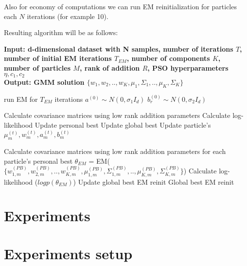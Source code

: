 \documentclass[a4paper]{article}
\begin{document}
Also for economy of computations we can run EM reinitialization for particles each $N$ iterations (for example 10).

Resulting algorithm will be as follows:

\begin{algorithm}
    \caption{}\label{alg:cap}
    \hspace*{\algorithmicindent} \textbf{Input: d-dimensional dataset with N samples, number of iterations $T$, number of initial EM iterations $T_{EM}$, 
    number of components $K$, number of particles $M$, rank of addition $R$,
    PSO hyperparameters $\eta, c_1, c_2$} \\
    \hspace*{\algorithmicindent} \textbf{Output: GMM solution $\{w_1, w_2, .., w_K, \mu_1, \Sigma_1, .., \mu_K, \Sigma_K\}$} 
    \begin{algorithmic}
    \State run EM for $T_{EM}$ iterations
        \State $a^{(0)}\sim N(0, \sigma_1I_d)$ 
            \State $b^{(0)}_r \sim N(0, \sigma_2 I_d)$
        \EndFor
    \EndFor
    
            \State Calculate covariance matrices using low rank addition parameters
            \State Calculate log-likelihood
            \State Update personal best
         \EndFor
         \State Update global best
            \State Update particle's $\mu_m^{(t)}, w_m^{(t)}, a_m^{(t)}, b_m^{(t)}$
         \EndFor
     \EndFor
     
      
        \State Calculate covariance matrices using low rank addition parameters for each particle's personal best
        \State $\theta_{EM}$ = EM($\{w_{1, m}^{(PB)}, w_{2, m}^{(PB)}, .., w_{K, m}^{(PB)}, \mu_{1, m}^{(PB)}, \Sigma_{1, m}^{(PB)}, .., \mu_{K, m}^{(PB)}, \Sigma_{K, m}^{(PB)}\}$)
        \State Calculate log-likelihood ($logp(\theta_{EM})$)
     \EndFor
     \State Update global best EM reinit
     \State \Return Global best EM reinit
    \end{algorithmic}
\end{algorithm}


\section{Experiments}

\section{Experiments setup}
\end{document}
